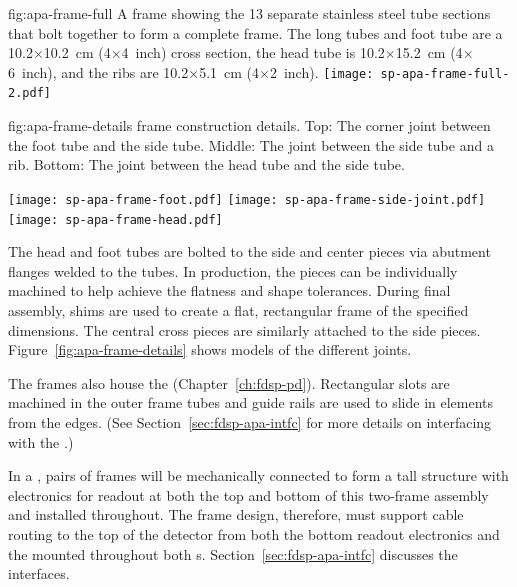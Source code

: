 \begin{dunefigure}{fig:apa-frame-full}
{A   frame showing the \num{13} separate stainless steel tube sections that bolt together to form a complete frame.  The long tubes and foot tube are a \num{10.2}$\times$\SI{10.2}{cm} (\num{4}$\times$\SI{4}{inch}) cross section, the head tube is \num{10.2}$\times$\SI{15.2}{cm} (\num{4}$\times$\SI{6}{inch}), and the ribs are \num{10.2}$\times$\SI{5.1}{cm} (\num{4}$\times$\SI{2}{inch}). 
}
\texttt{[image: sp-apa-frame-full-2.pdf]}
\end{dunefigure}

\begin{dunefigure}{fig:apa-frame-details}
{ frame construction details. Top: The corner joint between the foot tube and the side tube. Middle: The joint between the side tube and a rib. Bottom: The joint between the head tube and the side tube.}

\texttt{[image: sp-apa-frame-foot.pdf]}
\texttt{[image: sp-apa-frame-side-joint.pdf]}
\texttt{[image: sp-apa-frame-head.pdf]}
\end{dunefigure}

The head and foot tubes are bolted to the side and center pieces via abutment flanges welded to the tubes. In production, the pieces can be individually machined to help achieve the flatness and shape tolerances.  During final assembly, shims are used to create a flat, rectangular frame of the specified dimensions.  The central cross pieces are similarly attached to the side pieces.  Figure~\ref{fig:apa-frame-details} shows models of the different joints.   



The  frames also house the  (Chapter~\ref{ch:fdsp-pd}).  %
Rectangular slots are machined in the outer frame tubes and guide rails are used to slide in  elements from the edges. %
(See Section~\ref{sec:fdsp-apa-intfc} for more details on interfacing with the .)   

In a  , pairs of  frames will be mechanically connected to form a \tpcheight %
tall structure with electronics for  readout at both the top and bottom of this two-frame assembly and  installed throughout.  The  frame design, therefore, must support cable routing to the top of the detector from both the bottom  readout electronics and the  mounted throughout both s.  Section~\ref{sec:fdsp-apa-intfc} discusses the interfaces.



